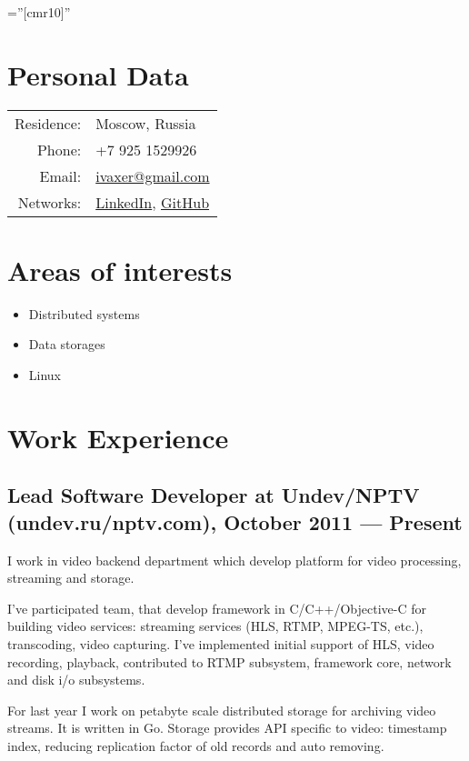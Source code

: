 \documentclass[a4paper,10pt]{article}
\begin{document}
\pagestyle{empty}

\font\fb=''[cmr10]''

\par{\bigskip\par}


\section{Personal Data}

\begin{tabular}{rl}
    Residence:   & Moscow, Russia\\
    Phone:     & +7 925 1529926\\
    Email:     & \href{mailto:ivaxer@gmail.com}{ivaxer@gmail.com} \\
    Networks: & \href{http://www.linkedin.com/in/ivaxer}{LinkedIn}, \href{https://github.com/ivaxer}{GitHub}
\end{tabular}


\section{Areas of interests}
\begin{itemize}
\item Distributed systems
\item Data storages
\item Linux
\end{itemize}


\section{Work Experience}
\subsection{Lead Software Developer at Undev/NPTV (undev.ru/nptv.com), October 2011 --- Present}
I work in video backend department which develop platform for video processing, streaming and storage.

I've participated team, that develop framework in C/C++/Objective-C for building video services: streaming services (HLS, RTMP, MPEG-TS, etc.), transcoding, video capturing. I've implemented initial  support of HLS, video recording, playback, contributed to RTMP subsystem, framework core, network and disk i/o subsystems.

For last year I work on petabyte scale distributed storage for archiving video streams. It is written in Go. Storage provides API specific to video: timestamp index, reducing replication factor of old records and auto removing.
\end{document}
